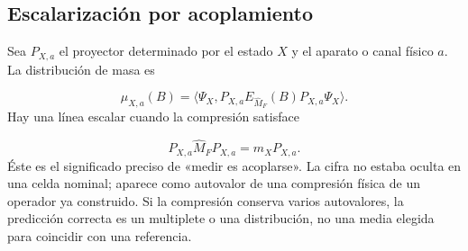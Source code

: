 \subsection{Escalarización por acoplamiento}
Sea \(P_{X,a}\) el proyector determinado por el estado \(X\) y el aparato o canal físico \(a\). La distribución de masa es

\[
\mu_{X,a}(B)
=\langle\Psi_X,
P_{X,a}E_{\widehat M_F}(B)P_{X,a}\Psi_X\rangle.
\]
Hay una línea escalar cuando la compresión satisface

\[
P_{X,a}\widehat M_FP_{X,a}=m_XP_{X,a}.
\]
Éste es el significado preciso de «medir es acoplarse». La cifra no estaba oculta en una celda nominal; aparece como autovalor de una compresión física de un operador ya construido. Si la compresión conserva varios autovalores, la predicción correcta es un multiplete o una distribución, no una media elegida para coincidir con una referencia.


